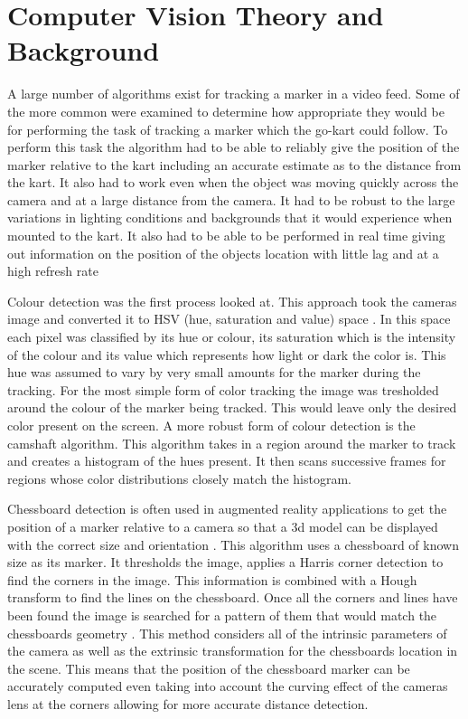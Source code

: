 \section{Computer Vision Theory and Background}

A large number of algorithms exist for tracking a marker in a video feed. Some of the more common were examined to determine how appropriate they would be for performing the task of tracking a marker which the go-kart could follow. To perform this task the algorithm had to be able to reliably give the position of the marker relative to the kart including an accurate estimate as to the distance from the kart. It also had to work even when the object was moving quickly across the camera and at a large distance from the camera. It had to be robust to the large variations in lighting conditions and backgrounds that it would experience when mounted to the kart. It also had to be able to be performed in real time giving out information on the position of the objects location with little lag and at a high refresh rate

Colour detection was the first process looked at. This approach took the cameras image and converted it to HSV (hue, saturation and value) space \cite{hsv}. In this space each pixel was classified by its hue or colour, its saturation which is the intensity of the colour and its value which represents how light or dark the color is. This hue was assumed to vary by very small amounts for the marker during the tracking. For the most simple form of color tracking the image was tresholded around the colour of the marker being tracked. This would leave only the desired color present on the screen. A more robust form of colour detection is the camshaft algorithm. This algorithm takes in a region around the marker to track and creates a histogram of the hues present. It then scans successive frames for regions whose color distributions closely match the histogram.  

Chessboard detection is often used in augmented reality applications to get the position of a marker relative to a camera so that a 3d model can be displayed with the correct size and orientation \cite{augmented}. This algorithm uses a chessboard of known size as its marker. It thresholds the image, applies a Harris corner detection to find the corners in the image. This information is combined with a Hough transform to find the lines on the chessboard. Once all the corners and lines have been found the image is searched for a pattern of them that would match the chessboards geometry \cite{chessboard}. This method considers all of the intrinsic parameters of the camera as well as the extrinsic transformation for the chessboards location in the scene. This means that the position of the chessboard marker can be accurately computed even taking into  account the curving effect of the cameras lens at the corners allowing for more accurate distance detection. 

